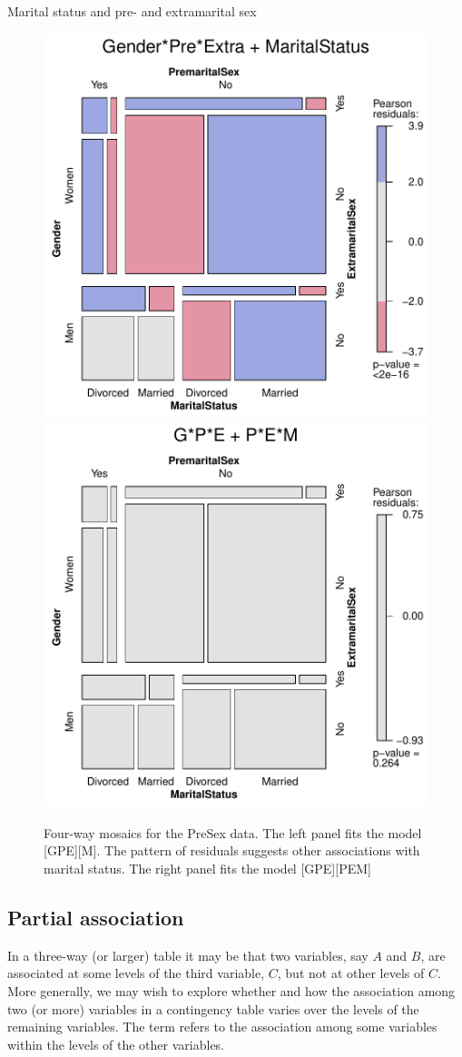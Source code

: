 \documentclass[10pt,krantz2]{krantz}\usepackage[]{graphicx}\usepackage[]{color}
\newenvironment{knitrout}{}{} %
\renewenvironment{knitrout}{\small\renewcommand{\baselinestretch}{.85}}{} %
\begin{document}
\begin{Example}[marital1]{Marital status and pre- and extramarital sex}
\begin{knitrout}
\begin{figure}[!htbp]
\centerline{\includegraphics[width=.49\textwidth]{ch05/fig/presex3-1} 
\includegraphics[width=.49\textwidth]{ch05/fig/presex3-2} }

\caption[Four-way mosaics for the PreSex data]{Four-way mosaics for the PreSex data. The left panel fits the model [GPE][M]. The pattern of residuals suggests other associations with marital status. The right panel fits the model [GPE][PEM]\label{fig:presex3}}
\end{figure}


\end{knitrout}

\end{Example}


\subsection{Partial association}\label{sec:mospart}

In a three-way (or larger) table it may be that two variables, say $A$ and $B$, are
associated at some levels of the third variable, $C$, but not at other
levels of $C$. More generally, we may wish to explore whether and how the
association among two (or more) variables in a contingency table varies over
the levels of the remaining variables. The term  refers
to the association among some variables within the levels of the other
variables.
\end{document}
